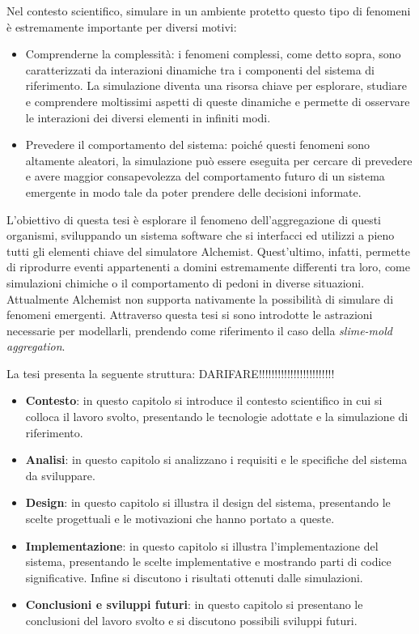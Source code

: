 Nel contesto scientifico, simulare in un ambiente protetto questo tipo di fenomeni è estremamente importante per diversi motivi:
\begin{itemize}
    \item Comprenderne la complessità: i fenomeni complessi, come detto sopra, sono caratterizzati da interazioni dinamiche tra
    i componenti del sistema di riferimento. La simulazione diventa una risorsa chiave per esplorare, studiare e comprendere 
    moltissimi aspetti di queste dinamiche e permette di osservare le interazioni dei diversi elementi in infiniti modi.
    \item Prevedere il comportamento del sistema: poiché questi fenomeni sono altamente aleatori, la simulazione può essere 
    eseguita per cercare di prevedere e avere maggior consapevolezza del comportamento
    futuro di un sistema emergente in modo tale da poter prendere delle decisioni informate.   
\end{itemize}

L'obiettivo di questa tesi è esplorare il fenomeno dell'aggregazione di questi organismi, sviluppando un sistema software che 
si interfacci ed utilizzi a pieno tutti gli elementi chiave del simulatore Alchemist. Quest'ultimo, infatti, permette di riprodurre eventi appartenenti 
a domini estremamente differenti tra loro, come simulazioni chimiche o il comportamento di pedoni in diverse situazioni. Attualmente Alchemist 
non supporta nativamente la possibilità di simulare di fenomeni emergenti. Attraverso questa tesi si sono introdotte
le astrazioni necessarie per modellarli, prendendo come riferimento il caso della \textit{slime-mold aggregation}.
\clearpage

La tesi presenta la seguente struttura: DARIFARE!!!!!!!!!!!!!!!!!!!!!!!!
\begin{itemize}
    \item \textbf{Contesto}: in questo capitolo si introduce il contesto scientifico in cui si colloca il lavoro svolto,
    presentando le tecnologie adottate e la simulazione di riferimento.
    \item \textbf{Analisi}: in questo capitolo si analizzano i requisiti e le specifiche del sistema da sviluppare.
    \item \textbf{Design}: in questo capitolo si illustra il design del sistema, presentando le scelte progettuali e le motivazioni che hanno portato a queste.
    \item \textbf{Implementazione}: in questo capitolo si illustra l'implementazione del sistema, presentando le scelte implementative e mostrando parti di codice significative. Infine si discutono i risultati ottenuti dalle simulazioni.
    \item \textbf{Conclusioni e sviluppi futuri}: in questo capitolo si presentano le conclusioni del lavoro svolto e si discutono possibili sviluppi futuri.
\end{itemize}